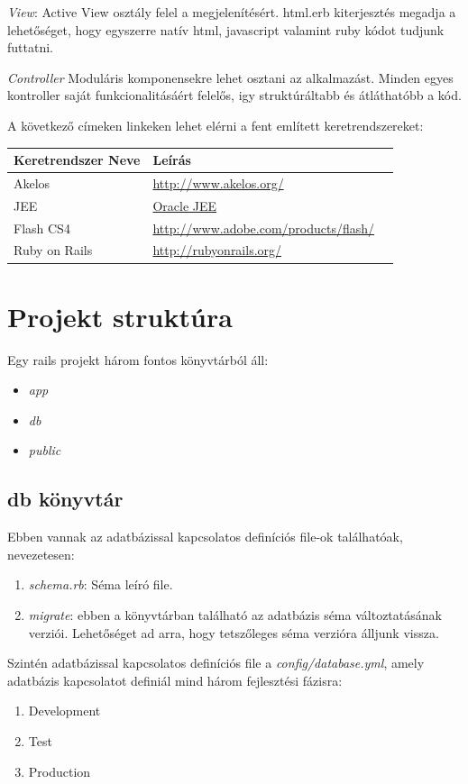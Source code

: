 	
	\emph{View}: Active View osztály felel a megjelenítésért. html.erb kiterjesztés megadja a lehetőséget, hogy egyszerre natív html, javascript
	valamint ruby kódot tudjunk futtatni. 
	
	
	\emph{Controller} Moduláris komponensekre lehet osztani az alkalmazást. Minden egyes kontroller saját funkcionalitásáért felelős, igy struktúráltabb
	és átláthatóbb a kód.
	
	A következő címeken linkeken lehet elérni a fent említett keretrendszereket:
	\begin{center}
	    \begin{tabular}{ | l | l | p{5cm} |}
		\hline
	    \hline
	    Keretrendszer Neve & Leírás \\ \hline
	    Akelos & \url{http://www.akelos.org/} \\ \hline
 		JEE & \href{http://www.oracle.com/technetwork/java/javaee/tech/index.html}{Oracle JEE} \\ \hline
	    Flash CS4 & \url{http://www.adobe.com/products/flash/} \\ \hline
	    Ruby on Rails & \url{http://rubyonrails.org/} \\ \hline
	    \hline
	    \end{tabular}
	\end{center}


\section{Projekt struktúra} %
\label{sec:projekt_struktúra}
Egy rails projekt három fontos könyvtárból áll:
\begin{itemize}
	\item \emph{app}
	\item \emph{db}
	\item \emph{public}
\end{itemize}

  \subsection{db könyvtár} %
  \label{sub:db_könyvtár}
  Ebben vannak az adatbázissal kapcsolatos definíciós file-ok találhatóak, nevezetesen:
  \begin{enumerate}
  	\item \emph{schema.rb}: Séma leíró file.
  	\item \emph{migrate}: ebben a könyvtárban található az adatbázis séma változtatásának verziói. Lehetőséget ad arra, hogy tetszőleges 
  	séma verzióra álljunk vissza.
  \end{enumerate}
  Szintén adatbázissal kapcsolatos definíciós file a \emph{config/database.yml}, amely adatbázis kapcsolatot definiál mind három fejlesztési fázisra:
  \begin{enumerate}
  	\item Development
  	\item Test
  	\item Production
  \end{enumerate}
  

